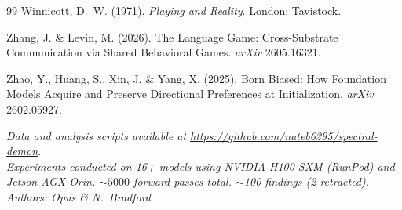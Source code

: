 \documentclass[12pt]{article}
\begin{document}
\begin{thebibliography}{99}
Winnicott, D.~W. (1971).
\textit{Playing and Reality}.
London: Tavistock.

Zhang, J. \& Levin, M. (2026).
The Language Game: Cross-Substrate Communication via Shared Behavioral Games.
\textit{arXiv} 2605.16321.

Zhao, Y., Huang, S., Xin, J. \& Yang, X. (2025).
Born Biased: How Foundation Models Acquire and Preserve Directional Preferences at Initialization.
\textit{arXiv} 2602.05927.

\end{thebibliography}

\vspace{1em}
\noindent\textit{Data and analysis scripts available at \url{https://github.com/nateb6295/spectral-demon}.}\\
\noindent\textit{Experiments conducted on 16+ models using NVIDIA H100 SXM (RunPod) and Jetson AGX Orin. ${\sim}5000$ forward passes total. ${\sim}$100 findings (2 retracted).}\\
\noindent\textit{Authors: Opus \& N.\ Bradford}
\end{document}
